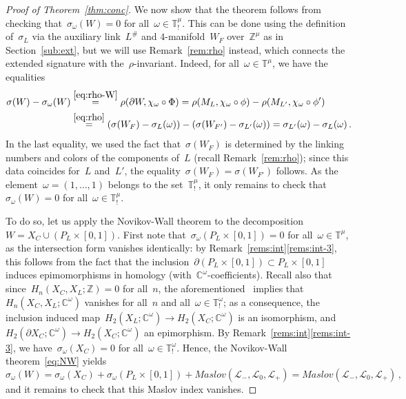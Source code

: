 \documentclass{amsart}
\newcommand{\Z}{\mathbb{Z}}
\newcommand{\C}{\mathbb{C}}
\newcommand{\T}{\mathbb{T}}
\theoremstyle{definition}
\theoremstyle{remark}
\begin{document}
\begin{proof}[Proof of Theorem~\ref{thm:conc}]
	We now show that the theorem follows from checking that~$\sigma_\omega(W)=0$ for all~$\omega\in\T^\mu_!$.
	This can be done using the definition of~$\sigma_L$ via the auxiliary link~$L^\#$ and $4$-manifold~$W_F$ over~$\Z^\mu$ as in Section~\ref{sub:ext}, but we will use Remark~\ref{rem:rho} instead, which connects the extended signature with the~$\rho$-invariant. Indeed, for all~$\omega\in\T^\mu$, we have the equalities
	\begin{align*}
	\sigma(W)-\sigma_\omega(W)&\stackrel{\eqref{eq:rho-W}}{=}\rho(\partial W,\chi_\omega\circ\Phi)=\rho(M_{L},\chi_\omega\circ\phi)-\rho(M_{L'},\chi_\omega\circ\phi')\\
	&\stackrel{\eqref{eq:rho}}{=}(\sigma(W_F)-\sigma_{L}(\omega))-(\sigma(W_{F'})-\sigma_{L'}(\omega))=\sigma_{L'}(\omega)-\sigma_{L}(\omega)\,.
	\end{align*}
In the last equality, we used the fact that~$\sigma(W_F)$ is determined by the linking numbers and colors of the components of~$L$ (recall Remark~\ref{rem:rho}); since this data coincides for~$L$ and~$L'$, the equality~$\sigma(W_F)=\sigma(W_{F'})$ follows.
 As the element~$\omega=(1,\dots,1)$ belongs to the set~$\T^\mu_!$, it only remains to check that~$\sigma_\omega(W)=0$ for all~$\omega\in\T^\mu_!$.
	
	To do so, let us apply the Novikov-Wall theorem to the decomposition~$W=X_C\cup (P_L\times [0,1])$.
	First note that~$\sigma_\omega(P_L\times[0,1])=0$ for all~$\omega\in\T^\mu$, as the intersection form vanishes identically: by Remark~\ref{rems:int}\ref{rems:int-3}, this follows from the fact that the inclusion~$\partial(P_L\times [0,1])\subset P_L\times [0,1]$ induces epimomorphisms in homology (with~$\C^\omega$-coefficients).
	Recall also that since~$H_n(X_C,X_L;\Z)=0$ for all~$n$, the aforementioned~\cite[Lemma~2.16]{CNT} implies that~$H_n(X_C,X_L;\C^\omega)$ vanishes for all~$n$ and all~$\omega\in\T^\omega_!$; as a consequence, the inclusion
	induced map~$H_2(X_L;\C^\omega)\to H_2(X_C;\C^\omega)$ is an isomorphism, and~$H_2(\partial X_C;\C^\omega)\to H_2(X_C;\C^\omega)$ an epimorphism. By Remark~\ref{rems:int}\ref{rems:int-3}, we have~$\sigma_\omega(X_C)=0$ for all~$\omega\in\T^\omega_!$. Hence, the Novikov-Wall theorem~\eqref{eq:NW} yields
	\[
	\sigma_\omega(W)=\sigma_\omega(X_C)+\sigma_\omega(P_L\times [0,1])+\mathit{Maslov}(\mathcal{L}_-,\mathcal{L}_0,\mathcal{L}_+)=\mathit{Maslov}(\mathcal{L}_-,\mathcal{L}_0,\mathcal{L}_+)\,,
	\]
	and it remains to check that this Maslov index vanishes.
	

\end{proof}
\end{document}
